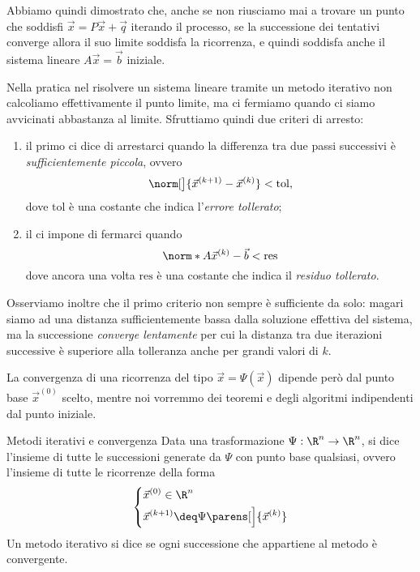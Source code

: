 Abbiamo quindi dimostrato che, anche se non riusciamo mai a trovare un punto che soddisfi $\vec x = P\vec x + \vec q$ iterando il processo, se la successione dei tentativi converge allora il suo limite soddisfa la ricorrenza, e quindi soddisfa anche il sistema lineare $A\vec x = \vec b$ iniziale.

\begin{remark}
    Nella pratica nel risolvere un sistema lineare tramite un metodo iterativo non calcoliamo effettivamente il punto limite, ma ci fermiamo quando ci siamo avvicinati abbastanza al limite. Sfruttiamo quindi due criteri di arresto: \begin{enumerate}[(1)]
        \item il primo ci dice di arrestarci quando la differenza tra due passi successivi è \emph{sufficientemente piccola}, ovvero \[
            \norm[\big]{\vec x^{(k+1)} - \vec x^{(k)}} < \mathrm{tol},
        \] dove $\mathrm{tol}$ è una costante che indica l'\emph{errore tollerato};
        \item il  ci impone di fermarci quando \[
            \norm*{A\vec x^{(k)} - \vec b} < \mathrm{res}
        \] dove ancora una volta $\mathrm{res}$ è una costante che indica il \emph{residuo tollerato}. 
    \end{enumerate}

    Osserviamo inoltre che il primo criterio non sempre è sufficiente da solo: magari siamo ad una distanza sufficientemente bassa dalla soluzione effettiva del sistema, ma la successione \emph{converge lentamente} per cui la distanza tra due iterazioni successive è superiore alla tolleranza anche per grandi valori di $k$.
\end{remark}

La convergenza di una ricorrenza del tipo $\vec x = \Psi(\vec x)$ dipende però dal punto base $\vec x^{(0)}$ scelto, mentre noi vorremmo dei teoremi e degli algoritmi indipendenti dal punto iniziale.

\begin{definition}
    {Metodi iterativi e convergenza}{}
    Data una trasformazione $\Psi : \R^n \to \R^n$, si dice  l'insieme di tutte le successioni generate da $\Psi$ con punto base qualsiasi, ovvero l'insieme di tutte le ricorrenze della forma \[
        \left\{
        \begin{aligned}
            &\vec x^{(0)} \in \R^n\\
            &\vec x^{(k+1)} \deq \Psi\parens[\Big]{\vec x^{(k)}}
        \end{aligned}
        \right.
    \] Un metodo iterativo si dice  se ogni successione che appartiene al metodo è convergente.
\end{definition}

